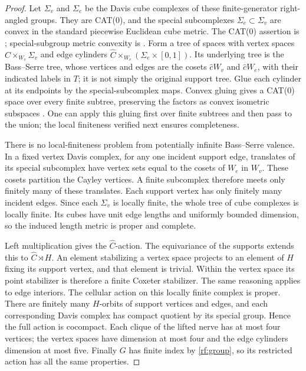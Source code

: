 \documentclass[11pt]{article}
\theoremstyle{definition}
\theoremstyle{remark}
\begin{document}
\begin{proof}
Let $\Sigma_v$ and $\Sigma_e$ be the Davis cube complexes of these
finite-generator right-angled groups.  They are CAT(0), and the special
subcomplexes $\Sigma_e\subset\Sigma_v$ are convex in the standard
piecewise Euclidean cube metric.  The CAT(0) assertion is
\cite[Theorem~12.2.1(i)]{Davis}; special-subgroup metric convexity is
\cite[Appendix, Proposition~A.2]{Swiatkowski}.
Form a tree of spaces with vertex spaces
$\widehat C\times_{W_v}\Sigma_v$ and edge cylinders
$\widehat C\times_{W_e}(\Sigma_e\times[0,1])$.
Its underlying tree is the Bass--Serre tree, whose vertices and edges
are the cosets $\widehat cW_v$ and $\widehat cW_e$, with their
indicated labels in $T$; it is not simply the original support tree.
Glue each cylinder at its endpoints by the special-subcomplex maps.
Convex gluing gives a CAT(0) space over every finite subtree, preserving
the factors as convex isometric subspaces
\cite[Theorem~II.11.1 and Remark~II.11.2]{BH}.
One can apply this gluing first over finite subtrees and then pass
to the union; the local finiteness verified next ensures completeness.

There is no local-finiteness problem from potentially infinite
Bass--Serre valence.  In a fixed vertex Davis complex, for any one
incident support edge, translates of its special subcomplex have
vertex sets equal to the cosets of $W_e$ in $W_v$.  These cosets
partition the Cayley vertices.  A finite subcomplex therefore meets
only finitely many of these translates.  Each support vertex has
only finitely many incident edges.  Since each $\Sigma_v$ is locally
finite, the whole tree of cube complexes is locally finite.  Its
cubes have unit edge lengths and uniformly bounded dimension, so
the induced length metric is proper and complete.

Left multiplication gives the $\widehat C$-action.  The equivariance
of the supports extends this to $\widehat C\rtimes H$.  An element
stabilizing a vertex space projects to an element of $H$ fixing its
support vertex, and that element is trivial.  Within the vertex
space its point stabilizer is therefore a finite Coxeter stabilizer.
The same reasoning applies to edge interiors.  The cellular action
on this locally finite complex is proper.  There are finitely many
$H$-orbits of support vertices and edges, and each corresponding
Davis complex has compact quotient by its special group.  Hence
the full action is cocompact.  Each clique of the lifted nerve has
at most four vertices; the vertex spaces have dimension at most four
and the edge cylinders dimension at most five.  Finally $G$ has finite
index by \eqref{rf:group}, so its restricted action has all the same
properties.
\end{proof}
\end{document}
